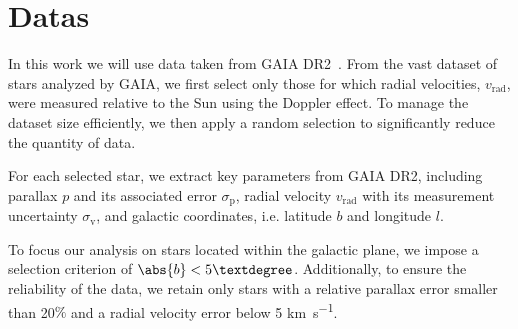\section{Datas}

In this work we will use data taken from GAIA DR2~\cite{GAIADR2}. From the vast dataset of stars analyzed by GAIA, we first select only those for which radial velocities, $v_{\text{rad}}$, were measured relative to the Sun using the Doppler effect. To manage the dataset size efficiently, we then apply a random selection to significantly reduce the quantity of data.

For each selected star, we extract key parameters from GAIA DR2, including parallax $p$ and its associated error $\sigma_{\text{p}}$, radial velocity $v_{\text{rad}}$ with its measurement uncertainty $\sigma_{\text{v}}$, and galactic coordinates, i.e. latitude $b$ and longitude $l$.

To focus our analysis on stars located within the galactic plane, we impose a selection criterion of $\abs{b} < 5°$. Additionally, to ensure the reliability of the data, we retain only stars with a relative parallax error smaller than 20$\%$ and a radial velocity error below 5 \unit{\kilo\meter\per\second}.
